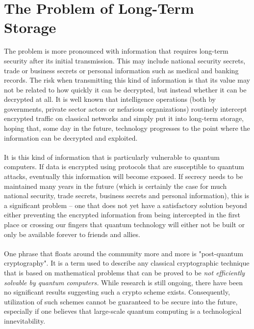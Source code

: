 \documentclass[aps,prl,twocolumn,10pt,nofootinbib]{revtex4}
\begin{document}
\section{The Problem of Long-Term Storage}
The problem is more pronounced with information that requires long-term security after its initial transmission.  This may include national security secrets, trade or business secrets or personal information such as medical and banking records.  The risk when transmitting this kind of information is that its value may not be related to how quickly it can be decrypted, but instead whether it can be decrypted at all.  It is well known that intelligence operations (both by governments, private sector actors or nefarious organizations) routinely intercept encrypted traffic on classical networks and simply put it into long-term storage, hoping that, some day in the future, technology progresses to the point where the information can be decrypted and exploited.  
\\
\\
It is this kind of information that is particularly vulnerable to quantum computers.  If data is encrypted using protocols that are susceptible to quantum attacks, eventually this information will become exposed.  If secrecy needs to be maintained many years in the future (which is certainly the case for much national security, trade secrets, business secrets and personal information), this is a significant problem -- one that does not yet have a satisfactory solution beyond either preventing the encrypted information from being intercepted in the first place or crossing our fingers that quantum technology will either not be built or only be available forever to friends and allies.   
\\
\\
One phrase that floats around the community more and more is "post-quantum cryptography".  It is a term used to describe any classical cryptographic technique that is based on mathematical problems that can be proved to be {\em not efficiently solvable by quantum computers.}  While research is still ongoing, there have been no significant results suggesting such a crypto scheme exists.  Consequently, utilization of such schemes cannot be guaranteed to be secure into the future, especially if one believes that large-scale quantum computing is a technological innevitability.  
\end{document}
